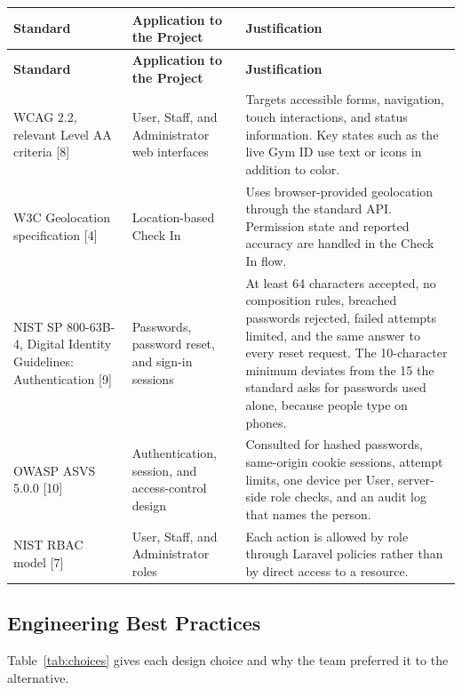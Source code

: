 \begin{center}
\small
\begin{longtable}{L{3.4cm} L{3.6cm} L{8.2cm}}
\toprule
\textbf{Standard} & \textbf{Application to the Project} & \textbf{Justification} \\
\midrule
\endfirsthead
\toprule
\textbf{Standard} & \textbf{Application to the Project} & \textbf{Justification} \\
\midrule
\endhead
\bottomrule
\endlastfoot
WCAG 2.2, relevant Level AA criteria [8]
&
User, Staff, and Administrator web interfaces
&
Targets accessible forms, navigation, touch interactions, and status information. Key states such as the live Gym ID use text or icons in addition to color. \\
\addlinespace
W3C Geolocation specification [4]
&
Location-based Check In
&
Uses browser-provided geolocation through the standard API. Permission state and reported accuracy are handled in the Check In flow. \\
\addlinespace
NIST SP 800-63B-4, Digital Identity Guidelines: Authentication [9]
&
Passwords, password reset, and sign-in sessions
&
At least 64 characters accepted, no composition rules, breached passwords rejected, failed attempts limited, and the same answer to every reset request. The 10-character minimum deviates from the 15 the standard asks for passwords used alone, because people type on phones. \\
\addlinespace
OWASP ASVS 5.0.0 [10]
&
Authentication, session, and access-control design
&
Consulted for hashed passwords, same-origin cookie sessions, attempt limits, one device per User, server-side role checks, and an audit log that names the person. \\
\addlinespace
NIST RBAC model [7]
&
User, Staff, and Administrator roles
&
Each action is allowed by role through Laravel policies rather than by direct access to a resource. \\
\end{longtable}
\end{center}

\subsection{Engineering Best Practices}

Table~\ref{tab:choices} gives each design choice and why the team preferred it to the alternative.


